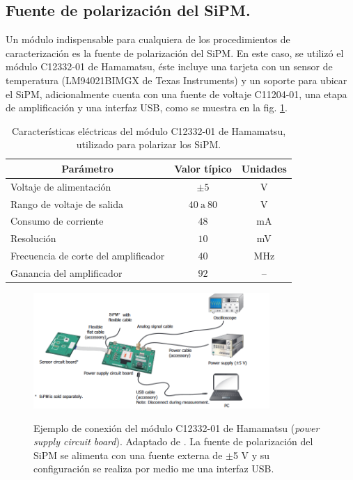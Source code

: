 \subsection{Fuente de polarización del SiPM.}
Un módulo indispensable para cualquiera de los procedimientos de caracterización es la fuente de polarización del SiPM. En este caso, se utilizó el módulo  C12332-01 de Hamamatsu, éste incluye una tarjeta con un sensor de temperatura (LM94021BIMGX de Texas Instruments)  y un soporte para ubicar el SiPM, adicionalmente cuenta con una fuente de voltaje C11204-01, una etapa de amplificación y una interfaz USB, como se muestra en la fig. \ref{fig:conexion_driverMPPC}.
\begin{table}[h!]
\caption{Características eléctricas del módulo  C12332-01 de Hamamatsu, utilizado para polarizar los SiPM.}
    \label{table_module_sorce}
	\centering
	\begin{tabular}{ c  c  c}
    \hline
    Parámetro       & Valor típico   & Unidades     \\ \hline
    \multicolumn{1}{l}{Voltaje de alimentación}     & $\pm 5$        & V        \\
    \multicolumn{1}{l}{Rango de voltaje de salida}      & $40~\mbox{a}~80$        & V          \\
    \multicolumn{1}{l}{Consumo de corriente}      & $48$        & mA          \\
    \multicolumn{1}{l}{Resolución}      & $10$        & mV          \\
    \multicolumn{1}{l}{Frecuencia de corte del amplificador}      & $40$        & MHz          \\
    \multicolumn{1}{l}{Ganancia del amplificador}      & $92$        &     --      \\ \hline
	\end{tabular}	
\end{table}
\begin{figure}[h!]
\begin{centering}
    \caption{Ejemplo de conexión del módulo C12332-01 de Hamamatsu (\textit{power supply circuit board}). Adaptado de \citep{Driver_mppc}. La fuente de polarización del SiPM se alimenta con una fuente externa de $\pm$5 V  y su configuración se realiza por medio me una interfaz USB.}
   \includegraphics[width=0.8\textwidth]{Images/Source_module.PNG}
    \label{fig:conexion_driverMPPC}
  \par\end{centering}
\end{figure}

